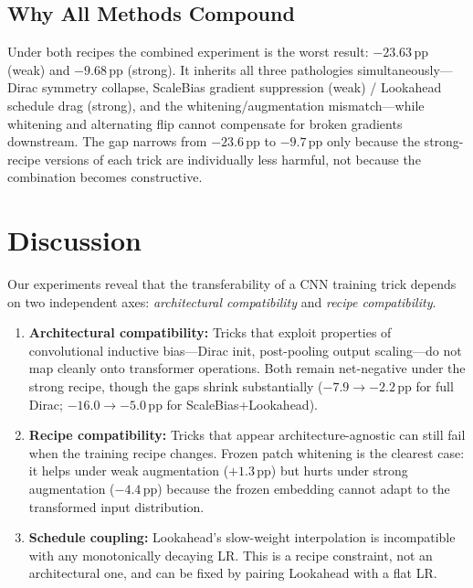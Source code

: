 \documentclass[10pt,twocolumn]{article}
\newcommand{\pp}{\,pp}   %
\begin{document}
\subsection{Why All Methods Compound}
Under both recipes the combined experiment is the worst result: $-23.63$\pp{} (weak) and $-9.68$\pp{} (strong).
It inherits all three pathologies simultaneously---Dirac symmetry collapse, ScaleBias gradient suppression (weak) / Lookahead schedule drag (strong), and the whitening/augmentation mismatch---while whitening and alternating flip cannot compensate for broken gradients downstream.
The gap narrows from $-23.6$\pp{} to $-9.7$\pp{} only because the strong-recipe versions of each trick are individually less harmful, not because the combination becomes constructive.

\section{Discussion}\label{sec:discussion}

Our experiments reveal that the transferability of a CNN training trick depends on two independent axes: \emph{architectural compatibility} and \emph{recipe compatibility}.

\begin{enumerate}[leftmargin=*, topsep=2pt, itemsep=2pt]
    \item \textbf{Architectural compatibility:} Tricks that exploit properties of convolutional inductive bias---Dirac init, post-pooling output scaling---do not map cleanly onto transformer operations.
          Both remain net-negative under the strong recipe, though the gaps shrink substantially ($-7.9 \to -2.2$\pp{} for full Dirac; $-16.0 \to -5.0$\pp{} for ScaleBias+Lookahead).
    \item \textbf{Recipe compatibility:} Tricks that appear architecture-agnostic can still fail when the training recipe changes.
          Frozen patch whitening is the clearest case: it helps under weak augmentation ($+1.3$\pp{}) but hurts under strong augmentation ($-4.4$\pp{}) because the frozen embedding cannot adapt to the transformed input distribution.
    \item \textbf{Schedule coupling:} Lookahead's slow-weight interpolation is incompatible with any monotonically decaying LR.
          This is a recipe constraint, not an architectural one, and can be fixed by pairing Lookahead with a flat LR.
\end{enumerate}
\end{document}

